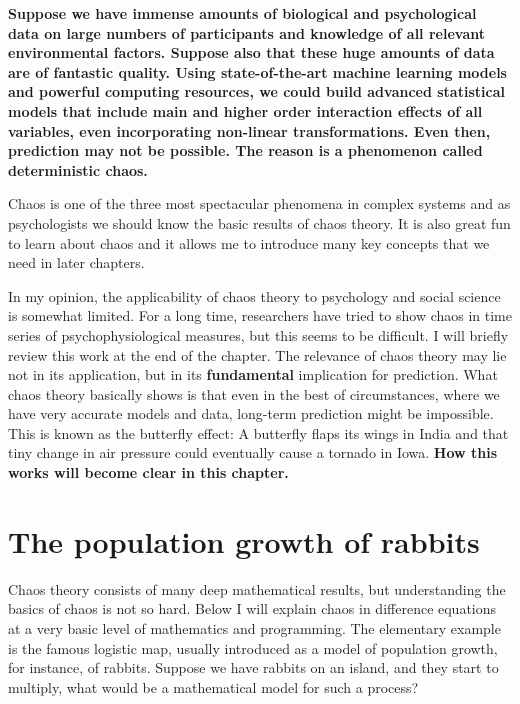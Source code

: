 \documentclass[
  letterpaper,
]{scrbook}
\begin{document}
\textbf{Suppose we have immense amounts of biological and psychological
data on large numbers of participants and knowledge of all relevant
environmental factors. Suppose also that these huge amounts of data are
of fantastic quality. Using state-of-the-art machine learning models and
powerful computing resources, we could build advanced statistical models
that include main and higher order interaction effects of all variables,
even incorporating non-linear transformations. Even then, prediction may
not be possible. The reason is a phenomenon called deterministic chaos.}

Chaos is one of the three most spectacular phenomena in complex systems
and as psychologists we should know the basic results of chaos theory.
It is also great fun to learn about chaos and it allows me to introduce
many key concepts that we need in later chapters.

In my opinion, the applicability of chaos theory to psychology and
social science is somewhat limited. For a long time, researchers have
tried to show chaos in time series of psychophysiological measures, but
this seems to be difficult. I will briefly review this work at the end
of the chapter. The relevance of chaos theory may lie not in its
application, but in its \textbf{fundamental} implication for prediction.
What chaos theory basically shows is that even in the best of
circumstances, where we have very accurate models and data, long-term
prediction might be impossible. This is known as the butterfly effect: A
butterfly flaps its wings in India and that tiny change in air pressure
could eventually cause a tornado in Iowa. \textbf{How this works will
become clear in this chapter.}

\hypertarget{the-population-growth-of-rabbits}{%
\section{The population growth of
rabbits}\label{the-population-growth-of-rabbits}}

Chaos theory consists of many deep mathematical results, but
understanding the basics of chaos is not so hard. Below I will explain
chaos in difference equations at a very basic level of mathematics and
programming. The elementary example is the famous logistic map, usually
introduced as a model of population growth, for instance, of rabbits.
Suppose we have rabbits on an island, and they start to multiply, what
would be a mathematical model for such a process?
\end{document}
